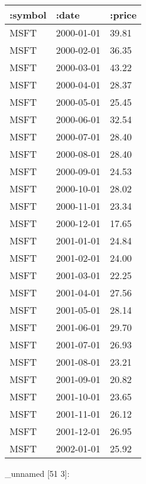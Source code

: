 \documentclass[]{article}
\newenvironment{Shaded}{\begin{snugshade}}{\end{snugshade}}
\newcommand{\AttributeTok}[1]{\textcolor[rgb]{0.77,0.63,0.00}{#1}}
\newcommand{\KeywordTok}[1]{\textcolor[rgb]{0.13,0.29,0.53}{\textbf{#1}}}
\newcommand{\NormalTok}[1]{#1}
\newcommand{\VariableTok}[1]{\textcolor[rgb]{0.00,0.00,0.00}{#1}}
\begin{document}
\begin{longtable}[]{@{}lll@{}}
\toprule
:symbol & :date & :price\tabularnewline
\midrule
\endhead
MSFT & 2000-01-01 & 39.81\tabularnewline
MSFT & 2000-02-01 & 36.35\tabularnewline
MSFT & 2000-03-01 & 43.22\tabularnewline
MSFT & 2000-04-01 & 28.37\tabularnewline
MSFT & 2000-05-01 & 25.45\tabularnewline
MSFT & 2000-06-01 & 32.54\tabularnewline
MSFT & 2000-07-01 & 28.40\tabularnewline
MSFT & 2000-08-01 & 28.40\tabularnewline
MSFT & 2000-09-01 & 24.53\tabularnewline
MSFT & 2000-10-01 & 28.02\tabularnewline
MSFT & 2000-11-01 & 23.34\tabularnewline
MSFT & 2000-12-01 & 17.65\tabularnewline
MSFT & 2001-01-01 & 24.84\tabularnewline
MSFT & 2001-02-01 & 24.00\tabularnewline
MSFT & 2001-03-01 & 22.25\tabularnewline
MSFT & 2001-04-01 & 27.56\tabularnewline
MSFT & 2001-05-01 & 28.14\tabularnewline
MSFT & 2001-06-01 & 29.70\tabularnewline
MSFT & 2001-07-01 & 26.93\tabularnewline
MSFT & 2001-08-01 & 23.21\tabularnewline
MSFT & 2001-09-01 & 20.82\tabularnewline
MSFT & 2001-10-01 & 23.65\tabularnewline
MSFT & 2001-11-01 & 26.12\tabularnewline
MSFT & 2001-12-01 & 26.95\tabularnewline
MSFT & 2002-01-01 & 25.92\tabularnewline
\bottomrule
\end{longtable}

\begin{Shaded}
\end{Shaded}

\_unnamed {[}51 3{]}:
\end{document}
